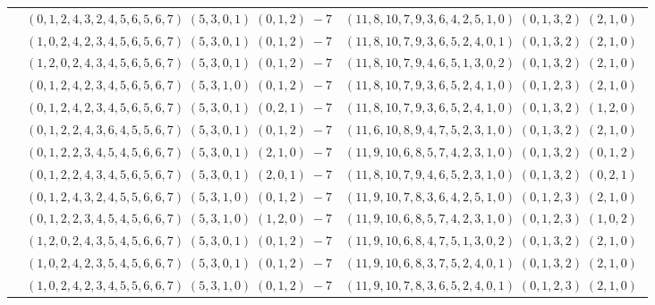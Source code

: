 \documentclass[11pt]{article}
\begin{document}
\begin{longtable}[l]{|c|c|c|}
 \cline{2-3} 
 & $(0 ,1 ,2 ,4 ,3 ,2 ,4 ,5 ,6 ,5 ,6 ,7) \;(5 ,3 ,0 ,1) \;(0 ,1 ,2) \;-7$ & $(11 ,8 ,10 ,7 ,9 ,3 ,6 ,4 ,2 ,5 ,1 ,0) \;(0 ,1 ,3 ,2) \;(2 ,1 ,0) \;$\\ 
 \cline{2-3} 
 & $(1 ,0 ,2 ,4 ,2 ,3 ,4 ,5 ,6 ,5 ,6 ,7) \;(5 ,3 ,0 ,1) \;(0 ,1 ,2) \;-7$ & $(11 ,8 ,10 ,7 ,9 ,3 ,6 ,5 ,2 ,4 ,0 ,1) \;(0 ,1 ,3 ,2) \;(2 ,1 ,0) \;$\\ 
 \cline{2-3} 
 & $(1 ,2 ,0 ,2 ,4 ,3 ,4 ,5 ,6 ,5 ,6 ,7) \;(5 ,3 ,0 ,1) \;(0 ,1 ,2) \;-7$ & $(11 ,8 ,10 ,7 ,9 ,4 ,6 ,5 ,1 ,3 ,0 ,2) \;(0 ,1 ,3 ,2) \;(2 ,1 ,0) \;$\\ 
 \cline{2-3} 
 & $(0 ,1 ,2 ,4 ,2 ,3 ,4 ,5 ,6 ,5 ,6 ,7) \;(5 ,3 ,1 ,0) \;(0 ,1 ,2) \;-7$ & $(11 ,8 ,10 ,7 ,9 ,3 ,6 ,5 ,2 ,4 ,1 ,0) \;(0 ,1 ,2 ,3) \;(2 ,1 ,0) \;$\\ 
 \cline{2-3} 
 & $(0 ,1 ,2 ,4 ,2 ,3 ,4 ,5 ,6 ,5 ,6 ,7) \;(5 ,3 ,0 ,1) \;(0 ,2 ,1) \;-7$ & $(11 ,8 ,10 ,7 ,9 ,3 ,6 ,5 ,2 ,4 ,1 ,0) \;(0 ,1 ,3 ,2) \;(1 ,2 ,0) \;$\\ 
 \cline{2-3} 
 & $(0 ,1 ,2 ,2 ,4 ,3 ,6 ,4 ,5 ,5 ,6 ,7) \;(5 ,3 ,0 ,1) \;(0 ,1 ,2) \;-7$ & $(11 ,6 ,10 ,8 ,9 ,4 ,7 ,5 ,2 ,3 ,1 ,0) \;(0 ,1 ,3 ,2) \;(2 ,1 ,0) \;$\\ 
 \cline{2-3} 
 & $(0 ,1 ,2 ,2 ,3 ,4 ,5 ,4 ,5 ,6 ,6 ,7) \;(5 ,3 ,0 ,1) \;(2 ,1 ,0) \;-7$ & $(11 ,9 ,10 ,6 ,8 ,5 ,7 ,4 ,2 ,3 ,1 ,0) \;(0 ,1 ,3 ,2) \;(0 ,1 ,2) \;$\\ 
 \cline{2-3} 
 & $(0 ,1 ,2 ,2 ,4 ,3 ,4 ,5 ,6 ,5 ,6 ,7) \;(5 ,3 ,0 ,1) \;(2 ,0 ,1) \;-7$ & $(11 ,8 ,10 ,7 ,9 ,4 ,6 ,5 ,2 ,3 ,1 ,0) \;(0 ,1 ,3 ,2) \;(0 ,2 ,1) \;$\\ 
 \cline{2-3} 
 & $(0 ,1 ,2 ,4 ,3 ,2 ,4 ,5 ,5 ,6 ,6 ,7) \;(5 ,3 ,1 ,0) \;(0 ,1 ,2) \;-7$ & $(11 ,9 ,10 ,7 ,8 ,3 ,6 ,4 ,2 ,5 ,1 ,0) \;(0 ,1 ,2 ,3) \;(2 ,1 ,0) \;$\\ 
 \cline{2-3} 
 & $(0 ,1 ,2 ,2 ,3 ,4 ,5 ,4 ,5 ,6 ,6 ,7) \;(5 ,3 ,1 ,0) \;(1 ,2 ,0) \;-7$ & $(11 ,9 ,10 ,6 ,8 ,5 ,7 ,4 ,2 ,3 ,1 ,0) \;(0 ,1 ,2 ,3) \;(1 ,0 ,2) \;$\\ 
 \cline{2-3} 
 & $(1 ,2 ,0 ,2 ,4 ,3 ,5 ,4 ,5 ,6 ,6 ,7) \;(5 ,3 ,0 ,1) \;(0 ,1 ,2) \;-7$ & $(11 ,9 ,10 ,6 ,8 ,4 ,7 ,5 ,1 ,3 ,0 ,2) \;(0 ,1 ,3 ,2) \;(2 ,1 ,0) \;$\\ 
 \cline{2-3} 
 & $(1 ,0 ,2 ,4 ,2 ,3 ,5 ,4 ,5 ,6 ,6 ,7) \;(5 ,3 ,0 ,1) \;(0 ,1 ,2) \;-7$ & $(11 ,9 ,10 ,6 ,8 ,3 ,7 ,5 ,2 ,4 ,0 ,1) \;(0 ,1 ,3 ,2) \;(2 ,1 ,0) \;$\\ 
 \cline{2-3} 
 & $(1 ,0 ,2 ,4 ,2 ,3 ,4 ,5 ,5 ,6 ,6 ,7) \;(5 ,3 ,1 ,0) \;(0 ,1 ,2) \;-7$ & $(11 ,9 ,10 ,7 ,8 ,3 ,6 ,5 ,2 ,4 ,0 ,1) \;(0 ,1 ,2 ,3) \;(2 ,1 ,0) \;$\\ 

\end{longtable}
\end{document}
